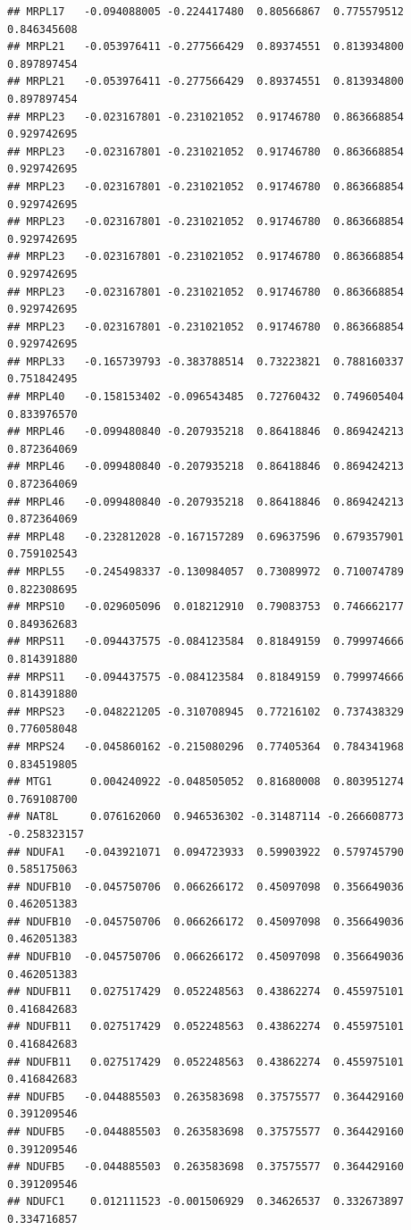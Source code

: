 \documentclass[
]{article}
\begin{document}
\begin{verbatim}
## MRPL17   -0.094088005 -0.224417480  0.80566867  0.775579512  0.846345608
## MRPL21   -0.053976411 -0.277566429  0.89374551  0.813934800  0.897897454
## MRPL21   -0.053976411 -0.277566429  0.89374551  0.813934800  0.897897454
## MRPL23   -0.023167801 -0.231021052  0.91746780  0.863668854  0.929742695
## MRPL23   -0.023167801 -0.231021052  0.91746780  0.863668854  0.929742695
## MRPL23   -0.023167801 -0.231021052  0.91746780  0.863668854  0.929742695
## MRPL23   -0.023167801 -0.231021052  0.91746780  0.863668854  0.929742695
## MRPL23   -0.023167801 -0.231021052  0.91746780  0.863668854  0.929742695
## MRPL23   -0.023167801 -0.231021052  0.91746780  0.863668854  0.929742695
## MRPL23   -0.023167801 -0.231021052  0.91746780  0.863668854  0.929742695
## MRPL33   -0.165739793 -0.383788514  0.73223821  0.788160337  0.751842495
## MRPL40   -0.158153402 -0.096543485  0.72760432  0.749605404  0.833976570
## MRPL46   -0.099480840 -0.207935218  0.86418846  0.869424213  0.872364069
## MRPL46   -0.099480840 -0.207935218  0.86418846  0.869424213  0.872364069
## MRPL46   -0.099480840 -0.207935218  0.86418846  0.869424213  0.872364069
## MRPL48   -0.232812028 -0.167157289  0.69637596  0.679357901  0.759102543
## MRPL55   -0.245498337 -0.130984057  0.73089972  0.710074789  0.822308695
## MRPS10   -0.029605096  0.018212910  0.79083753  0.746662177  0.849362683
## MRPS11   -0.094437575 -0.084123584  0.81849159  0.799974666  0.814391880
## MRPS11   -0.094437575 -0.084123584  0.81849159  0.799974666  0.814391880
## MRPS23   -0.048221205 -0.310708945  0.77216102  0.737438329  0.776058048
## MRPS24   -0.045860162 -0.215080296  0.77405364  0.784341968  0.834519805
## MTG1      0.004240922 -0.048505052  0.81680008  0.803951274  0.769108700
## NAT8L     0.076162060  0.946536302 -0.31487114 -0.266608773 -0.258323157
## NDUFA1   -0.043921071  0.094723933  0.59903922  0.579745790  0.585175063
## NDUFB10  -0.045750706  0.066266172  0.45097098  0.356649036  0.462051383
## NDUFB10  -0.045750706  0.066266172  0.45097098  0.356649036  0.462051383
## NDUFB10  -0.045750706  0.066266172  0.45097098  0.356649036  0.462051383
## NDUFB11   0.027517429  0.052248563  0.43862274  0.455975101  0.416842683
## NDUFB11   0.027517429  0.052248563  0.43862274  0.455975101  0.416842683
## NDUFB11   0.027517429  0.052248563  0.43862274  0.455975101  0.416842683
## NDUFB5   -0.044885503  0.263583698  0.37575577  0.364429160  0.391209546
## NDUFB5   -0.044885503  0.263583698  0.37575577  0.364429160  0.391209546
## NDUFB5   -0.044885503  0.263583698  0.37575577  0.364429160  0.391209546
## NDUFC1    0.012111523 -0.001506929  0.34626537  0.332673897  0.334716857

\end{verbatim}
\end{document}
